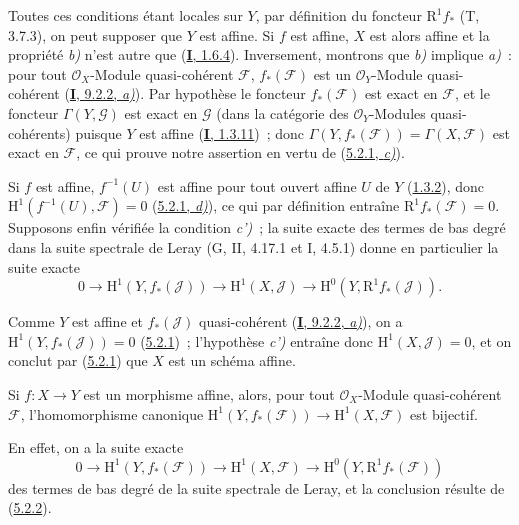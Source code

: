 Toutes ces conditions étant locales sur $Y$, par définition du foncteur
$\mathrm{R}^1f_*$ (T, 3.7.3), on peut supposer que $Y$ est affine. Si $f$
est affine, $X$ est alors affine et la propriété \emph{b)} n'est autre que
(\hyperref[I.1.6.4-fr]{\textbf{I}, 1.6.4}). Inversement, montrons que \emph{b)} implique
\emph{a)}~: pour tout $\mathcal{O}_X$-Module quasi-cohérent $\mathcal{F}$,
$f_*(\mathcal{F})$ est un $\mathcal{O}_Y$-Module quasi-cohérent
(\hyperref[I.9.2.2-fr]{\textbf{I}, 9.2.2, \emph{a)}}). Par hypothèse le foncteur
$f_*(\mathcal{F})$ est exact en $\mathcal{F}$, et le foncteur
$\Gamma(Y,\mathcal{G})$ est exact en $\mathcal{G}$ (dans la catégorie des
$\mathcal{O}_Y$-Modules quasi-cohérents) puisque $Y$ est affine
(\hyperref[I.1.3.11-fr]{\textbf{I}, 1.3.11})~; donc
$\Gamma(Y,f_*(\mathcal{F}))=\Gamma(X,\mathcal{F})$ est exact en
$\mathcal{F}$, ce qui prouve notre assertion en vertu de
(\hyperref[II.5.2.1-fr]{5.2.1, \emph{c)}}).

Si $f$ est affine, $f^{-1}(U)$ est affine pour tout ouvert affine $U$ de
$Y$ (\hyperref[II.1.3.2-fr]{1.3.2}), donc
$\mathrm{H}^1(f^{-1}(U),\mathcal{F})=0$
(\hyperref[II.5.2.1-fr]{5.2.1, \emph{d)}}), ce qui par définition entraîne
$\mathrm{R}^1f_*(\mathcal{F})=0$. Supposons enfin vérifiée la condition
\emph{c')}~; la suite exacte des termes de bas degré dans la suite spectrale de
Leray (G, II, 4.17.1 et I, 4.5.1) donne en particulier la suite exacte
\[
  0\to\mathrm{H}^1(Y,f_*(\mathcal{J}))\to
  \mathrm{H}^1(X,\mathcal{J})\to
  \mathrm{H}^0(Y,\mathrm{R}^1f_*(\mathcal{J})).
\]

Comme $Y$ est affine et $f_*(\mathcal{J})$ quasi-cohérent
(\hyperref[I.9.2.2-fr]{\textbf{I}, 9.2.2, \emph{a)}}), on a
$\mathrm{H}^1(Y,f_*(\mathcal{J}))=0$
(\hyperref[II.5.2.1-fr]{5.2.1})~; l'hypothèse \emph{c')} entraîne donc
$\mathrm{H}^1(X,\mathcal{J})=0$, et on conclut par
(\hyperref[II.5.2.1-fr]{5.2.1}) que $X$ est un schéma affine.

\begin{corollary}[5.2.3]
\label{II.5.2.3-fr}
Si $f:X\to Y$ est un morphisme affine, alors, pour tout
$\mathcal{O}_X$-Module quasi-cohérent $\mathcal{F}$, l'homomorphisme
canonique
$\mathrm{H}^1(Y,f_*(\mathcal{F}))\to\mathrm{H}^1(X,\mathcal{F})$ est
bijectif.
\end{corollary}


En effet, on a la suite exacte
\[
  0\to\mathrm{H}^1(Y,f_*(\mathcal{F}))\to
  \mathrm{H}^1(X,\mathcal{F})\to
  \mathrm{H}^0(Y,\mathrm{R}^1f_*(\mathcal{F}))
\]
des termes de bas degré de la suite spectrale de Leray, et la conclusion
résulte de (\hyperref[II.5.2.2-fr]{5.2.2}).

